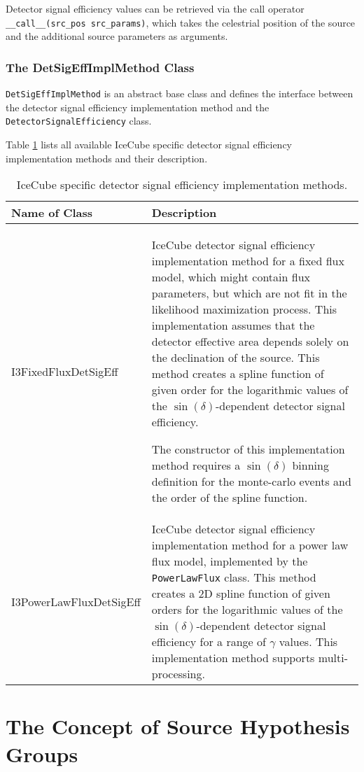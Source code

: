 \documentclass{article}
\newcommand{\code}[1]{\texttt{#1}}
\newcommand{\class}[1]{\colorbox{blue!30}{\code{#1}}}
\begin{document}
Detector signal efficiency values can be retrieved via the call operator
\code{\_\_call\_\_(src\_pos src\_params)}, which takes the celestrial position
of the source and the additional source parameters as arguments.

\subsubsection{The DetSigEffImplMethod Class}

\class{DetSigEffImplMethod} is an abstract base class and defines the interface
between the detector signal efficiency implementation method and the
\class{DetectorSignalEfficiency} class.

Table \ref{tbl:I3DetSigEffImplMethod} lists all available IceCube specific
detector signal efficiency implementation methods and their description.
\begin{table}
\caption{IceCube specific detector signal efficiency implementation methods.}
\label{tbl:I3DetSigEffImplMethod}

\begin{tabular}{l | p{10cm}}
\hline
Name of Class & Description \\
\hline
I3FixedFluxDetSigEff & IceCube detector signal efficiency implementation method for a
    fixed flux model, which might contain flux parameters, but which
    are not fit in the likelihood maximization process.
    This implementation assumes that the detector effective
    area depends solely on the declination of the source. This method creates
    a spline function of given order for the logarithmic values of the
    $\sin(\delta)$-dependent detector signal efficiency.

    The constructor of this implementation method requires a $\sin(\delta)$
    binning definition for the monte-carlo events and the order of the spline
    function.\\
I3PowerLawFluxDetSigEff & IceCube detector signal efficiency implementation method for a
    power law flux model, implemented by the \class{PowerLawFlux} class.
    This method creates a 2D spline function of given orders for the logarithmic
    values of the $\sin(\delta)$-dependent detector signal efficiency for a
    range of $\gamma$ values. This implementation method supports
    multi-processing.
\end{tabular}
\end{table}

\section{The Concept of Source Hypothesis Groups}
\end{document}
